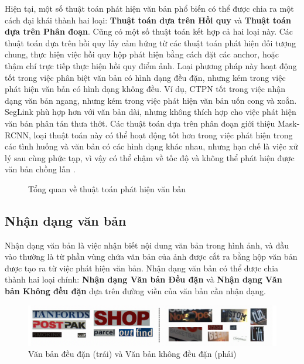 Hiện tại, một số thuật toán phát hiện văn bản phổ biến có thể được chia ra một cách đại khái thành hai loại: \textbf{Thuật toán dựa trên Hồi quy} và \textbf{Thuật toán dựa trên Phân đoạn}. Cũng có một số thuật toán kết hợp cả hai loại này. Các thuật toán dựa trên hồi quy lấy cảm hứng từ các thuật toán phát hiện đối tượng chung, thực hiện việc hồi quy hộp phát hiện bằng cách đặt các anchor, hoặc thậm chí trực tiếp thực hiện hồi quy điểm ảnh. Loại phương pháp này hoạt động tốt trong việc phân biệt văn bản có hình dạng đều đặn, nhưng kém trong việc phát hiện văn bản có hình dạng không đều. Ví dụ, CTPN tốt trong việc nhận dạng văn bản ngang, nhưng kém trong việc phát hiện văn bản uốn cong và xoắn. SegLink phù hợp hơn với văn bản dài, nhưng không thích hợp cho việc phát hiện văn bản phân tán thưa thớt. Các thuật toán dựa trên phân đoạn giới thiệu Mask-RCNN, loại thuật toán này có thể hoạt động tốt hơn trong việc phát hiện trong các tình huống và văn bản có các hình dạng khác nhau, nhưng hạn chế là việc xử lý sau cùng phức tạp, vì vậy có thể chậm về tốc độ và không thể phát hiện được văn bản chồng lấn \cite{Dive-into-ocr-2022}.

\begin{figure}[h]
    
    \centering
    \caption{Tổng quan về thuật toán phát hiện văn bản}
\end{figure}

\subsection{Nhận dạng văn bản}
Nhận dạng văn bản là việc nhận biết nội dung văn bản trong hình ảnh, và đầu vào thường là từ phần vùng chứa văn bản của ảnh được cắt ra bằng hộp văn bản được tạo ra từ việc phát hiện văn bản. Nhận dạng văn bản có thể được chia thành hai loại chính: \textbf{Nhận dạng Văn bản Đều đặn} và \textbf{Nhận dạng Văn bản Không đều đặn} dựa trên đường viền của văn bản cần nhận dạng.

\begin{figure}[h]
    \includegraphics[scale=0.4]{chapter2/images/regular-irregular-text.png}
    \centering
    \caption{Văn bản đều đặn (trái) và Văn bản không đều đặn (phải)}
\end{figure}

